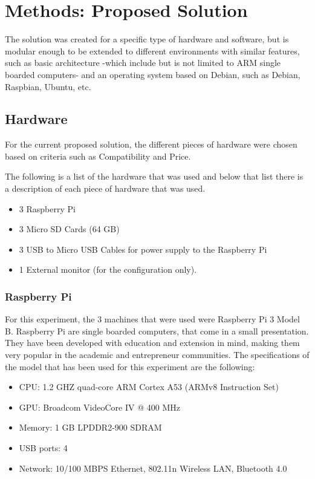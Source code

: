 \section{Methods: Proposed Solution}
	
The solution was created for a specific type of hardware and
software, but is modular enough to be extended to different
environments with similar features, such as basic architecture -which
include but is not limited to ARM single boarded computers- and an
operating system based on Debian, such as Debian, Raspbian, Ubuntu,
etc.
	
\subsection{Hardware}
	
For the current proposed solution, the different pieces of hardware
were chosen based on criteria such as Compatibility and Price.
	
The following is a list of the hardware that was used and below that
list there is a description of each piece of hardware that was used.
	
	\begin{itemize}
	\item 3 Raspberry Pi
	\item 3 Micro SD Cards (64 GB)
	\item 3 USB to Micro USB Cables for power supply to the Raspberry Pi
	\item 1 External monitor (for the configuration only).
	\end{itemize}
	

\subsubsection{Raspberry Pi}
	
For this experiment, the 3 machines that were used were Raspberry Pi 3
Model B.  Raspberry Pi are single boarded computers, that come in a
small presentation. They have been developed with education and
extension in mind, making them very popular in the academic and
entrepreneur communities. The specifications of the model that has
been used for this experiment are the following:
	
\begin{itemize}
		\item CPU: 1.2 GHZ quad-core ARM Cortex A53 (ARMv8 Instruction Set)
		\item GPU: Broadcom VideoCore IV @ 400 MHz
		\item Memory: 1 GB LPDDR2-900 SDRAM
		\item USB ports: 4
		\item Network: 10/100 MBPS Ethernet, 802.11n Wireless LAN, Bluetooth 4.0
\end{itemize}
\cite{hackaday2016}  
	
